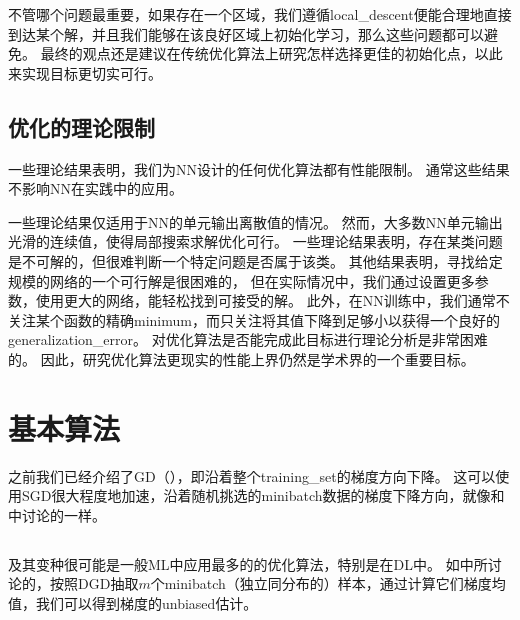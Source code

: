 
不管哪个问题最重要，如果存在一个区域，我们遵循\gls{local_descent}便能合理地直接到达某个解，并且我们能够在该良好区域上初始化学习，那么这些问题都可以避免。
最终的观点还是建议在传统优化算法上研究怎样选择更佳的初始化点，以此来实现目标更切实可行。


\subsection{优化的理论限制}
\label{sec:theoretical_limits_of_optimization}
一些理论结果表明，我们为\gls{NN}设计的任何优化算法都有性能限制\citep{Blum-Rivest-1992,Judd-1989,Wolpert-MacReady-1997}。
通常这些结果不影响\gls{NN}在实践中的应用。


一些理论结果仅适用于\gls{NN}的单元输出离散值的情况。
然而，大多数\gls{NN}单元输出光滑的连续值，使得局部搜索求解优化可行。
一些理论结果表明，存在某类问题是不可解的，但很难判断一个特定问题是否属于该类。
其他结果表明，寻找给定规模的网络的一个可行解是很困难的，
但在实际情况中，我们通过设置更多参数，使用更大的网络，能轻松找到可接受的解。
此外，在\gls{NN}训练中，我们通常不关注某个函数的精确\gls{minimum}，而只关注将其值下降到足够小以获得一个良好的\gls{generalization_error}。
对优化算法是否能完成此目标进行理论分析是非常困难的。
因此，研究优化算法更现实的性能上界仍然是学术界的一个重要目标。



\section{基本算法}
\label{sec:basic_algorithms}
之前我们已经介绍了\gls{GD}（），即沿着整个\gls{training_set}的梯度方向下降。
这可以使用\gls{SGD}很大程度地加速，沿着随机挑选的\gls{minibatch}数据的梯度下降方向，就像和中讨论的一样。


\subsection{}
\label{sec:stochastic_gradient_descent_chap8}
及其变种很可能是一般\gls{ML}中应用最多的的优化算法，特别是在\gls{DL}中。
如中所讨论的，按照\gls{DGD}抽取$m$个\gls{minibatch}（独立同分布的）样本，通过计算它们梯度均值，我们可以得到梯度的\gls{unbiased}估计。

